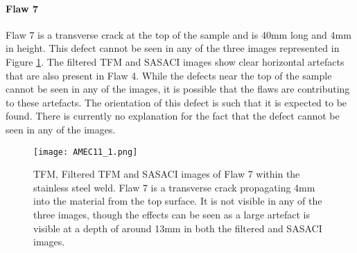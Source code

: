 \clearpage

\paragraph{Flaw 7}

Flaw 7 is a transverse crack at the top of the sample and is 40mm long and 4mm in height. This defect cannot be seen in any of the three images represented in Figure \ref{fig:AMEC_flaw7}. The filtered TFM and SASACI images show clear horizontal artefacts that are also present in Flaw 4. While the defects near the top of the sample cannot be seen in any of the images, it is possible that the flaws are contributing to these artefacts. The orientation of this defect is such that it is expected to be found. There is currently no explanation for the fact that the defect cannot be seen in any of the images.

\vspace{20mm}

\begin{figure}[h!]
\centering
		\texttt{[image: AMEC11\_1.png]}
		\caption{TFM, Filtered TFM and SASACI images of Flaw 7 within the stainless steel weld. Flaw 7 is a transverse crack propagating 4mm into the material from the top surface. It is not visible in any of the three images, though the effects can be seen as a large artefact is visible at a depth of around 13mm in both the filtered and SASACI images.}
		\label{fig:AMEC_flaw7}
\end{figure}

